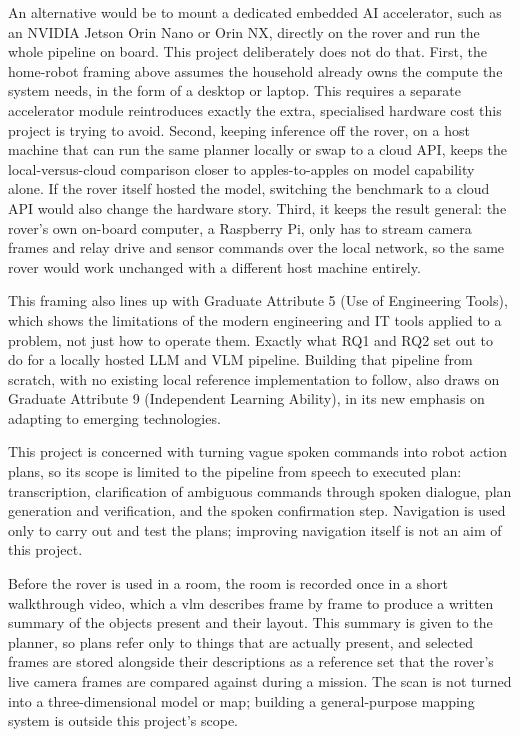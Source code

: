An alternative would be to mount a dedicated embedded AI accelerator, such as an NVIDIA Jetson
Orin Nano or Orin NX, directly on the rover and run the whole pipeline on board. This project
deliberately does not do that. First, the home-robot framing above assumes the household
already owns the compute the system needs, in the form of a desktop or laptop. This requires a
separate accelerator module reintroduces exactly the extra, specialised hardware cost this
project is trying to avoid. Second, keeping inference off the rover, on a host machine that can
run the same planner locally or swap to a cloud API, keeps the local-versus-cloud comparison
closer to apples-to-apples on model capability alone. If the rover itself hosted the model,
switching the benchmark to a cloud API would also change the hardware story. Third, it keeps
the result general: the rover's own on-board computer, a Raspberry Pi, only has to stream
camera frames and relay drive and sensor commands over the local network, so the same rover
would work unchanged with a different host machine entirely.

This framing also lines up with Graduate Attribute 5 (Use of Engineering Tools), which shows the
limitations of the modern engineering and IT tools applied to a problem, not just how to
operate them. Exactly what RQ1 and RQ2 set out to do for a locally hosted LLM and VLM
pipeline. Building that pipeline from scratch, with no existing local reference implementation
to follow, also draws on Graduate Attribute 9 (Independent Learning Ability), in its new
emphasis on adapting to emerging technologies.


%

This project is concerned with turning vague spoken commands into robot action plans, so its
scope is limited to the pipeline from speech to executed plan: transcription, clarification of
ambiguous commands through spoken dialogue, plan generation and verification, and the spoken
confirmation step. Navigation is used only to carry out and test the plans; improving
navigation itself is not an aim of this project.

Before the rover is used in a room, the room is recorded once in a short walkthrough video,
which a \ac{vlm} describes frame by frame to produce a written summary of the objects present
and their layout. This summary is given to the planner, so plans refer only to things that are
actually present, and selected frames are stored alongside their descriptions as a reference
set that the rover's live camera frames are compared against during a mission. The scan is not
turned into a three-dimensional model or map; building a general-purpose mapping system is
outside this project's scope.

